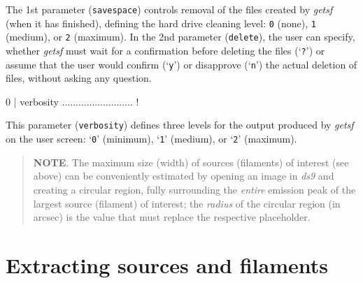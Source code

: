 \documentclass[a4paper,10pt]{article}
\begin{document}
The 1st parameter (\verb!savespace!) controls removal of the files created by \textsl{getsf} (when it has finished), defining the
hard drive cleaning level: \verb!0! (none), \verb!1! (medium), or \verb!2! (maximum). In the 2nd parameter (\verb!delete!), the
user can specify, whether \textsl{getsf} must wait for a confirmation before deleting the files (`\verb!?!') or assume that the
user would confirm (`\verb!y!') or disapprove (`\verb!n!') the actual deletion of files, without asking any question.
\begin{verbnobox}[\mbox{}\small]
 0                   | verbosity .......................... !
\end{verbnobox}
This parameter (\verb!verbosity!) defines three levels for the output produced by \textsl{getsf} on the user screen: `\verb!0!'
(minimum), `\verb!1!' (medium), or `\verb!2!' (maximum).

\begin{quote} %
\textbf{NOTE}. The maximum size (width) of sources (filaments) of interest (see above) can be conveniently estimated by opening
an image in \textsl{ds9} and creating a circular region, fully surrounding the \emph{entire} emission peak of the largest source
(filament) of interest; the \emph{radius} of the circular region (in arcsec) is the value that must replace the respective
placeholder.
\end{quote} %


\section{Extracting sources and filaments}
\label{extract}
\end{document}

